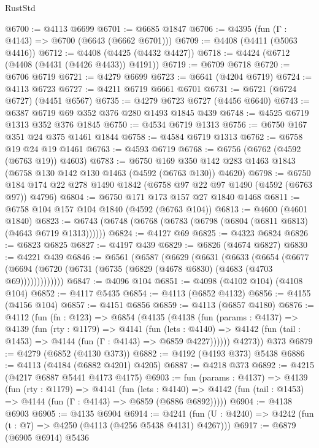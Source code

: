 \begin{lexlean}{RustStd}
\begin{coremodule}
@6700 := @4113 @6699
@6701 := @6685 @1847
@6706 := @4395 (fun (Γ : @4143) => @6700 (@6643 (@6662 @6701)))
@6709 := @4408 (@4411 (@5063 @4416))
@6712 := @4408 (@4425 (@4432 @4427))
@6718 := @4424 (@6712 (@4408 (@4431 (@4426 @4433)) @4191))
@6719 := @6709 @6718
@6720 := @6706 @6719
@6721 := @4279 @6699
@6723 := @6641 (@4204 @6719)
@6724 := @4113 @6723
@6727 := @4211 @6719 @6661 @6701
@6731 := @6721 (@6724 @6727) (@4451 @6567)
@6735 := @4279 @6723 @6727 (@4456 @6640)
@6743 := @6387 @6719 @69 @352 @376 @280 @1493 @1845 @439
@6748 := @4525 @6719 @1313 @352 @376 @1845
@6750 := @4534 @6719 @1313
@6756 := @6750 @167 @351 @24 @375 @1461 @1844
@6758 := @4584 @6719 @1313
@6762 := @6758 @19 @24 @19 @1461
@6763 := @4593 @6719
@6768 := @6756 (@6762 (@4592 (@6763 @19)) @4603)
@6783 := @6750
    @169
    @350
    @142
    @283
    @1463
    @1843
    (@6758 @130 @142 @130 @1463 (@4592 (@6763 @130)) @4620)
@6798 := @6750 @184 @174 @22 @278 @1490 @1842 (@6758 @97 @22 @97 @1490 (@4592 (@6763 @97)) @4796)
@6804 := @6750 @171 @173 @157 @27 @1840 @1468
@6811 := @6758 @104 @157 @104 @1840 (@4592 (@6763 @104))
@6813 := @4600 (@4601 @1840)
@6823 := @6743 (@6748 (@6768 (@6783 (@6798 (@6804 (@6811 @6813) (@4643 @6719 @1313))))))
@6824 := @4127 @69
@6825 := @4323 @6824
@6826 := @6823 @6825
@6827 := @4197 @439
@6829 := @6826 (@4674 @6827)
@6830 := @4221 @439
@6846 := @6561
    (@6587
      (@6629
        (@6631
          (@6633
            (@6654
              (@6677 (@6694 (@6720 (@6731 (@6735 (@6829 (@4678 @6830) (@4683 (@4703 @69)))))))))))))
@6847 := @4096 @104
@6851 := @4098 (@4102 @104) (@4108 @104)
@6852 := @4117 @5435
@6854 := @4113 (@6852 @4132)
@6856 := @4155 (@4156 @104)
@6857 := @4151 @6856
@6859 := @4113 (@6857 @4180)
@6876 := @4112
    (fun (fn : @123) =>
    @6854
      (@4135
        (@4138
          (fun (params : @4137) =>
          @4139
            (fun (rty : @1179) =>
            @4141
              (fun (lets : @4140) =>
              @4142 (fun (tail : @1453) => @4144 (fun (Γ : @4143) => @6859 @4227))))))
        @4273))
    @373
@6879 := @4279 (@6852 (@4130 @373))
@6882 := @4192 (@4193 @373) @5438
@6886 := @4113 (@4184 (@6882 @4201) @4205)
@6887 := @4218 @373
@6892 := @4215 (@4217 @6887 @5441 @4173 @4175)
@6903 := fun (params : @4137) =>
  @4139
    (fun (rty : @1179) =>
    @4141
      (fun (lets : @4140) =>
      @4142 (fun (tail : @1453) => @4144 (fun (Γ : @4143) => @6859 (@6886 @6892)))))
@6904 := @4138 @6903
@6905 := @4135 @6904
@6914 := @4241 (fun (U : @4240) => @4242 (fun (t : @7) => @4250 (@4113 (@4256 @5438 @4131) @4267)))
@6917 := @6879 (@6905 @6914) @5436

\end{coremodule}
\end{lexlean}
